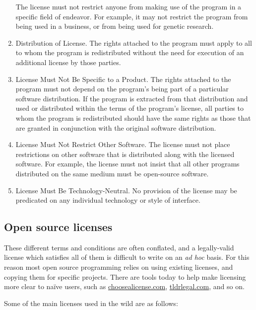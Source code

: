 \begin{enumerate}
  The license must not restrict anyone from making use of the program in a specific field of endeavor. For example, it may not restrict the program from being used in a business, or from being used for genetic research.
\item{Distribution of License}.
  The rights attached to the program must apply to all to whom the program is redistributed without the need for execution of an additional license by those parties.
\item{License Must Not Be Specific to a Product}.
  The rights attached to the program must not depend on the program's being part of a particular software distribution. If the program is extracted from that distribution and used or distributed within the terms of the program's license, all parties to whom the program is redistributed should have the same rights as those that are granted in conjunction with the original software distribution.
\item{License Must Not Restrict Other Software}.
  The license must not place restrictions on other software that is distributed along with the licensed software. For example, the license must not insist that all other programs distributed on the same medium must be open-source software.
\item{License Must Be Technology-Neutral}.
  No provision of the license may be predicated on any individual technology or style of interface.
\end{enumerate}

\subsection{Open source licenses}
\label{subsec:licenses}

These different terms and conditions are often conflated, and a legally-valid license which satisfies all of them is difficult to write on an {\it ad hoc} basis. For this reason most open source programming relies on using existing licenses, and copying them for specific projects. There are tools today to help make licensing more clear to na\"ive users, such as \href{https://choosealicense.com}{choosealicense.com}, \href{https://tldrlegal.com}{tldrlegal.com}, and so on.

Some of the main licenses used in the wild are as follows:


